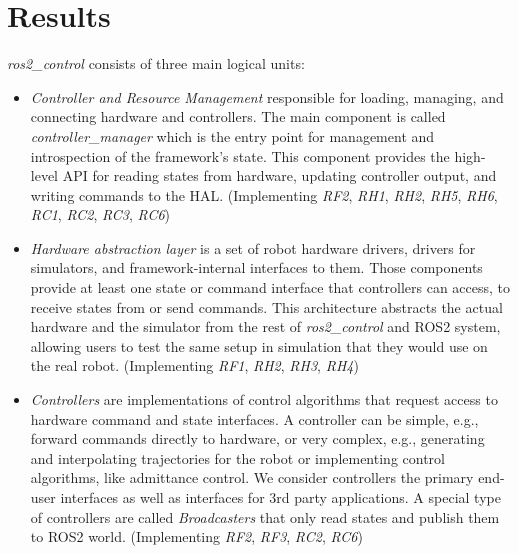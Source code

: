 \documentclass[journal]{IEEEtran}
\begin{document}
\section{Results}
\label{sec:results}

\emph{ros2\_control} consists of three main logical units:
\begin{itemize}
    \item \emph{Controller and Resource Management} responsible for loading, managing, and connecting hardware and controllers. The main component is called \emph{controller\_manager} which is the entry point for management and introspection of the framework's state. This component provides the high-level API for reading states from hardware, updating controller output, and writing commands to the HAL. (Implementing \emph{RF2}, \emph{RH1}, \emph{RH2}, \emph{RH5}, \emph{RH6},  \emph{RC1}, \emph{RC2}, \emph{RC3}, \emph{RC6})
    \item \emph{Hardware abstraction layer} is a set of robot hardware drivers, drivers for simulators, and framework-internal interfaces to them. Those components provide at least one state or command interface that controllers can access, to receive states from or send commands. This architecture abstracts the actual hardware and the simulator from the rest of \emph{ros2\_control} and ROS2 system, allowing users to test the same setup in simulation that they would use on the real robot. (Implementing \emph{RF1}, \emph{RH2}, \emph{RH3}, \emph{RH4})
    \item \emph{Controllers} are implementations of control algorithms that request access to hardware command and state interfaces. A controller can be simple, e.g., forward commands directly to hardware, or very complex, e.g., generating and interpolating trajectories for the robot or implementing control algorithms, like admittance control. We consider controllers the primary end-user interfaces as well as interfaces for 3rd party applications. A special type of controllers are called \emph{Broadcasters} that only read states and publish them to ROS2 world. (Implementing \emph{RF2}, \emph{RF3}, \emph{RC2}, \emph{RC6})
\end{itemize}
\end{document}
